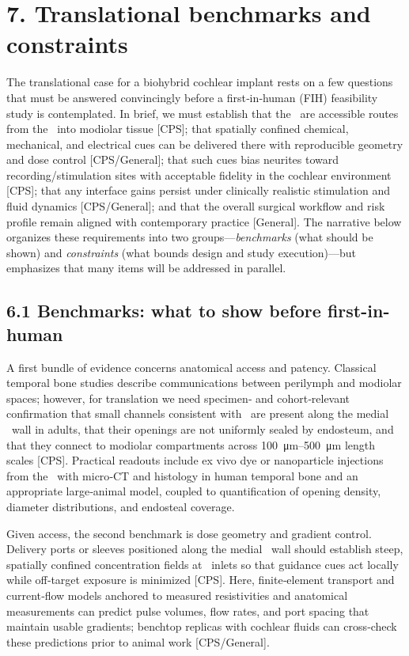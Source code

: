 \section*{7. Translational benchmarks and constraints}

The translational case for a biohybrid cochlear implant rests on a few questions that must be answered convincingly before a first‑in‑human (FIH) feasibility study is contemplated. In brief, we must establish that the \CPS\ are accessible routes from the \ST\ into modiolar tissue [CPS]; that spatially confined chemical, mechanical, and electrical cues can be delivered there with reproducible geometry and dose control [CPS/General]; that such cues bias neurites toward recording/stimulation sites with acceptable fidelity in the cochlear environment [CPS]; that any interface gains persist under clinically realistic stimulation and fluid dynamics [CPS/General]; and that the overall surgical workflow and risk profile remain aligned with contemporary practice [General]. The narrative below organizes these requirements into two groups—\emph{benchmarks} (what should be shown) and \emph{constraints} (what bounds design and study execution)—but emphasizes that many items will be addressed in parallel.

\subsection*{6.1 Benchmarks: what to show before first-in-human}

A first bundle of evidence concerns anatomical access and patency. Classical temporal bone studies describe communications between perilymph and modiolar spaces; however, for translation we need specimen‑ and cohort‑relevant confirmation that small channels consistent with \CPS\ are present along the medial \ST\ wall in adults, that their openings are not uniformly sealed by endosteum, and that they connect to modiolar compartments across \SIrange{100}{500}{\micro\meter} length scales [CPS]. Practical readouts include ex vivo dye or nanoparticle injections from the \ST\ with micro‑CT and histology in human temporal bone and an appropriate large‑animal model, coupled to quantification of opening density, diameter distributions, and endosteal coverage.\cite{raskandersen2006, sando1971, masuda1971, lim1970}

Given access, the second benchmark is dose geometry and gradient control. Delivery ports or sleeves positioned along the medial \ST\ wall should establish steep, spatially confined concentration fields at \CPS\ inlets so that guidance cues act locally while off‑target exposure is minimized [CPS]. Here, finite‑element transport and current‑flow models anchored to measured resistivities and anatomical measurements can predict pulse volumes, flow rates, and port spacing that maintain usable gradients; benchtop replicas with cochlear fluids can cross‑check these predictions prior to animal work [CPS/General].\cite{Micco2006, nella2023}

